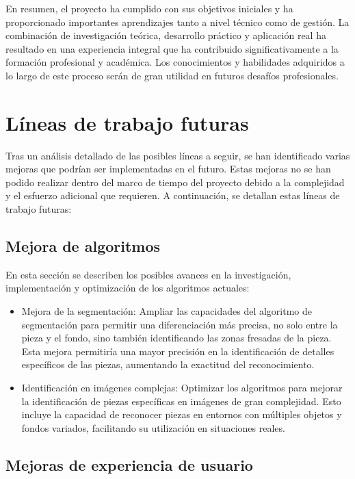 En resumen, el proyecto ha cumplido con sus objetivos iniciales y ha proporcionado importantes aprendizajes tanto a nivel técnico como de gestión. La combinación de investigación teórica, desarrollo práctico y aplicación real ha resultado en una experiencia integral que ha contribuido significativamente a la formación profesional y académica. Los conocimientos y habilidades adquiridos a lo largo de este proceso serán de gran utilidad en futuros desafíos profesionales.

\section{Líneas de trabajo futuras}\label{líneas-de-trabajo-futuras}

Tras un análisis detallado de las posibles líneas a seguir, se han identificado varias mejoras que podrían ser implementadas en el futuro. Estas mejoras no se han podido realizar dentro del marco de tiempo del proyecto debido a la complejidad y el esfuerzo adicional que requieren. A continuación, se detallan estas líneas de trabajo futuras:

\subsection{Mejora de algoritmos}\label{mejora-de-algoritmos}

En esta sección se describen los posibles avances en la investigación, implementación y optimización de los algoritmos actuales:

\begin{itemize}
    \item Mejora de la segmentación: Ampliar las capacidades del algoritmo de segmentación para permitir una diferenciación más precisa, no solo entre la pieza y el fondo, sino también identificando las zonas fresadas de la pieza. Esta mejora permitiría una mayor precisión en la identificación de detalles específicos de las piezas, aumentando la exactitud del reconocimiento.
    \item Identificación en imágenes complejas: Optimizar los algoritmos para mejorar la identificación de piezas específicas en imágenes de gran complejidad. Esto incluye la capacidad de reconocer piezas en entornos con múltiples objetos y fondos variados, facilitando su utilización en situaciones reales.
\end{itemize}

\subsection{Mejoras de experiencia de usuario}\label{mejoras-de-experiencia-de-usuario}

